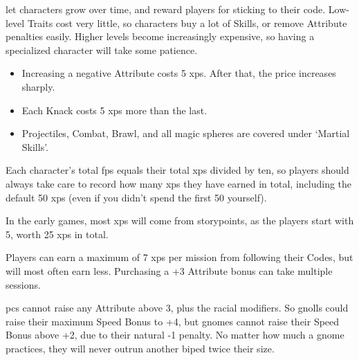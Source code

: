 \begin{multicols}{2}


\noindent
{} let characters grow over time, and reward players for sticking to their code.
Low-level Traits cost very little, so characters buy a lot of Skills, or remove Attribute penalties easily.
Higher levels become increasingly expensive, so having a specialized character will take some patience.

\begin{itemize}
  \item
  Increasing a negative Attribute costs 5 \glspl{xp}.
  After that, the price increases sharply.
  \item
  Each Knack costs 5 \glspl{xp} more than the last.
  \item
  Projectiles, Combat, Brawl, and all magic spheres are covered under `Martial Skills'.
\end{itemize}

Each character's total \glspl{fp} equals their total \glspl{xp} divided by ten, so players should always take care to record how many \glspl{xp} they have earned in total, including the default 50 \glspl{xp} (even if you didn't spend the first 50 yourself).

In the early games, most \glspl{xp} will come from \glspl{storypoint}, as the players start with 5, worth 25 \glspl{xp} in total.


Players can earn a maximum of 7 \glspl{xp} per mission from following their Codes, but will most often earn less.
Purchasing a +3 Attribute bonus can take multiple sessions.

\label{racial_limits}
\Glspl{pc} cannot raise any Attribute above 3, plus the racial modifiers.
So gnolls could raise their maximum Speed Bonus to +4, but gnomes cannot raise their Speed Bonus above +2, due to their natural -1 penalty.
No matter how much a gnome practices, they will never outrun another biped twice their size.

\vspace{4em}

\end{multicols}

\XPchart
